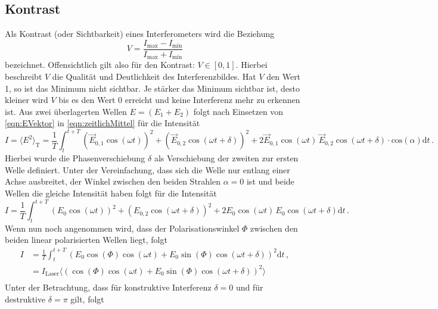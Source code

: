 \subsection{Kontrast} \label{sec:kontrast}
Als Kontrast (oder Sichtbarkeit) eines Interferometers wird die Beziehung
\begin{equation} \label{eqn:kontrast}
    V = \frac{I_\text{max} - I_\text{min}}{I_\text{max} + I_\text{min}}
\end{equation}
bezeichnet. Offensichtlich gilt also für den Kontrast: $V \in [0,1]$.
Hierbei beschreibt $V$ die Qualität und Deutlichkeit des Interferenzbildes. Hat $V$ den Wert 1, so ist das Minimum nicht sichtbar. Je stärker das Minimum sichtbar ist, desto kleiner wird $V$ bis es den Wert 0 erreicht und keine Interferenz mehr zu erkennen ist.
Aus zwei überlagerten Wellen $E=(E_1+E_2)$ folgt nach Einsetzen von \autoref{eqn:EVektor} in \autoref{eqn:zeitlichMittel} für die Intensität
\begin{equation*}
    I = \langle E^2\rangle _{\text{T}}= \frac{1}{T}\int_t^{t+T}  (\vec{E}_{0,1}\cos{(\omega t)})^2+(\vec{E}_{0,2}\cos{(\omega t+ \delta)})^2+2\vec{E}_{0,1}\cos{(\omega t)}\, \vec{E}_{0,2}\cos{(\omega t+ \delta)}\cdot\text{cos}(\alpha)\text{d}t\, .
\end{equation*}
Hierbei wurde die Phasenverschiebung $\delta$ als Verschiebung der zweiten zur ersten Welle definiert. Unter der Vereinfachung, dass sich die Welle nur entlang einer Achse ausbreitet, der Winkel zwischen den beiden Strahlen $\alpha=0$ ist und beide Wellen die gleiche Intensität haben folgt für die Intensität 
\begin{equation*}
    I=\frac{1}{T}\int_t^{t+T} (E_{0}\cos{(\omega t)})^2+(E_{0,2}\cos{(\omega t+ \delta)})^2+2E_{0}\cos{(\omega t)}\, E_{0}\cos{(\omega t+ \delta)}\text{d}t\, .
\end{equation*}
Wenn nun noch angenommen wird, dass der Polarisationswinkel $\Phi$ zwischen den beiden linear polarisierten Wellen liegt, folgt
\begin{align*}
    I&=\frac{1}{T}\int_t^{t+T} (E_{0}\cos{(\Phi)}\cos{(\omega t)}+E_{0}\sin{(\Phi)}\cos{(\omega t+ \delta)})^2\text{d}t\, ,\\
    &= I_{\text{Laser}}\langle (\cos{(\Phi)}\cos{(\omega t)}+E_{0}\sin{(\Phi)}\cos{(\omega t+ \delta)})^2\rangle \\
\end{align*}
Unter der Betrachtung, dass für konstruktive Interferenz $\delta = 0$ und für destruktive $\delta =\pi$ gilt, folgt
